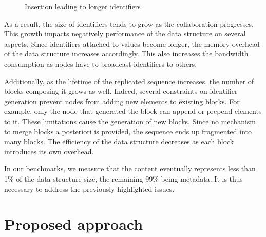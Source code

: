 \documentclass[sigplan,10pt,authorversion]{acmart}
\newcommand{\trm}[1]{\mathit{#1}}
\newcommand{\id}[3]{$\trm{#1}^{\trm{#2}}_{\trm{#3}}$}
\newcommand{\widthletter}{7mm}
\begin{document}
\begin{figure}[ht!]
    \centering
    \caption{Insertion leading to longer identifiers}
    \label{fig:example-split}
\end{figure}

As a result, the size of identifiers tends to grow as the collaboration progresses.
This growth impacts negatively performance of the data structure on several aspects.
Since identifiers attached to values become longer, the memory overhead of the data structure increases accordingly.
This also increases the bandwidth consumption as nodes have to broadcast identifiers to others.

Additionally, as the lifetime of the replicated sequence increases, the number of blocks composing it grows as well.
Indeed, several constraints on identifier generation prevent nodes from adding new elements to existing blocks.
For example, only the node that generated the block can append or prepend elements to it.
These limitations cause the generation of new blocks.
Since no mechanism to merge blocks a posteriori is provided, the sequence ends up fragmented into many blocks.
The efficiency of the data structure decreases as each block introduces its own overhead.

In our benchmarks, we measure that the content eventually represents less than 1\% of the data structure size, the remaining 99\% being metadata.
It is thus necessary to address the previously highlighted issues.

\section{Proposed approach}
\label{sec:proposition}
\end{document}
